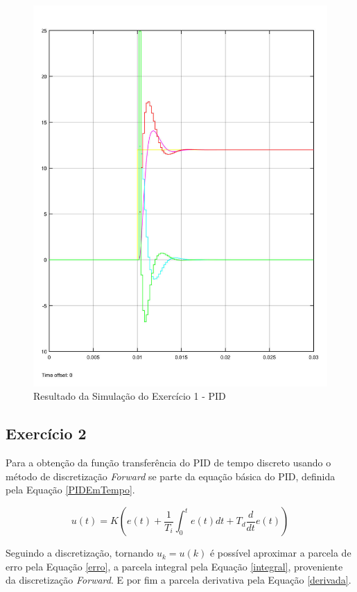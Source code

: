 	\begin{figure}[H]
		\centering
		\includegraphics[scale = .4]{Imagens/PIDExercicioI.pdf}
		\caption{Resultado da Simulação do Exercício 1 - PID}
		\label{fig:PIDExercicioI}
	\end{figure}
	
	
\subsection{Exercício 2}
	Para a obtenção da função transferência do PID de tempo discreto usando o método de discretização \emph{Forward} se parte da equação básica do PID, definida pela Equação \ref{PIDEmTempo}.
	
	\begin{equation}
		u(t) = K \left( e(t) + \frac{1}{T_{i}} \int_0^t e(t) dt + T_d \frac{d}{dt} e(t) \right) 
		\label{PIDEmTempo}
	\end{equation}
	
	Seguindo a discretização, tornando $u_k = u(k)$ é possível aproximar a parcela de erro pela Equação \ref{erro}, a parcela integral pela Equação \ref{integral}, proveniente da discretização \emph{Forward}. E por fim a parcela derivativa pela Equação \ref{derivada}.
	
